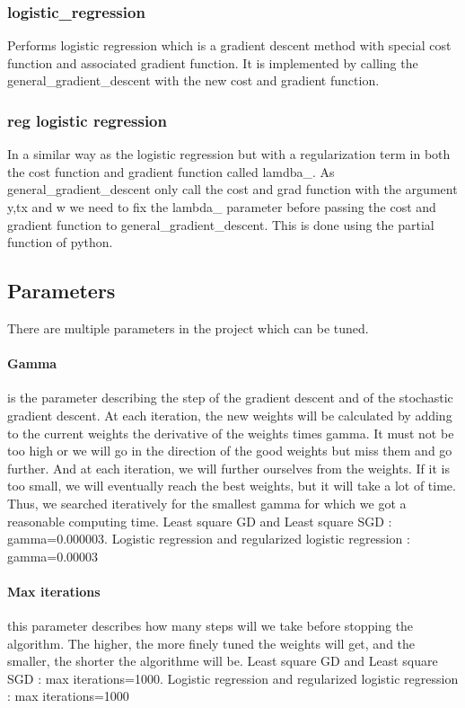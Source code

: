 \documentclass[10pt,conference,compsocconf]{IEEEtran}
\begin{document}
\subsubsection{logistic\_regression}
Performs logistic regression which is a gradient descent method with special cost function and associated gradient function. It is implemented by calling the general\_gradient\_descent with the new cost and gradient function.

\subsubsection{reg logistic regression}
In a similar way as the logistic regression but with a regularization term in both the cost function and gradient function called lamdba\_. As general\_gradient\_descent only call the cost and grad function with the argument y,tx and w we need to fix the lambda\_ parameter before passing the cost and gradient function to general\_gradient\_descent. This is done using the partial function of python.

\subsection{Parameters}
There are multiple parameters in the project which can be tuned. 
\paragraph{Gamma} is the parameter describing the step of the gradient descent and of the stochastic gradient descent. At each iteration, the new weights will be calculated by adding to the current weights the derivative of the weights times gamma. It must not be too high or we will go in the direction of the good weights but miss them and go further. And at each iteration, we will further ourselves from the weights. If it is too small, we will eventually reach the best weights, but it will take a lot of time. Thus, we searched iteratively for the smallest gamma for which we got a reasonable computing time.
Least square GD and Least square SGD : gamma=0.000003.
Logistic regression and regularized logistic regression : gamma=0.00003
\paragraph{Max iterations} this parameter describes how many steps will we take before stopping the algorithm. The higher, the more finely tuned the weights will get, and the smaller, the shorter the algorithme will be. 
Least square GD and Least square SGD : max iterations=1000.
Logistic regression and regularized logistic regression :  max iterations=1000
\end{document}

